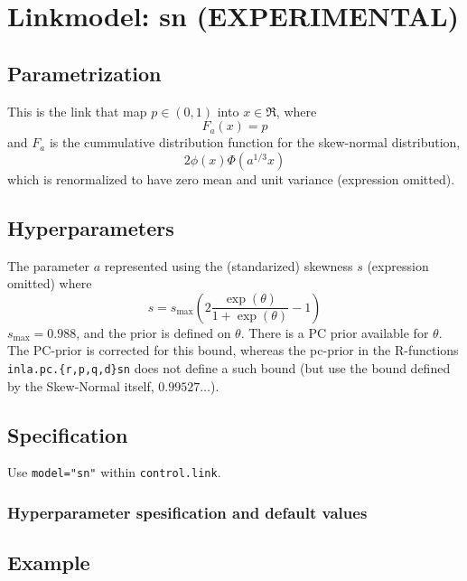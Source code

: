 \documentclass[a4paper,11pt]{article}
\begin{document}
\section*{Linkmodel: sn (EXPERIMENTAL)}

\subsection*{Parametrization}

This is the link that map $p\in (0,1)$ into $x\in\Re$, where
\begin{displaymath}
    F_{a}(x) = p
\end{displaymath}
and $F_{a}$ is the cummulative distribution function for the
skew-normal distribution,
\begin{displaymath}
    2\phi(x)\Phi(a^{1/3}x)
\end{displaymath}
which is renormalized to have zero mean and unit variance (expression
omitted).

\subsection*{Hyperparameters}

The parameter $a$ represented using the (standarized) skewness $s$
(expression omitted) where
\begin{displaymath}
    s = s_{\text{max}} \left(2\frac{\exp(\theta)}{1+ \exp(\theta)} -1\right)
\end{displaymath}
$s_{\text{max}} = 0.988$, and the prior is defined on $\theta$. There
is a PC prior available for $\theta$.
The PC-prior is corrected for
this bound, whereas the pc-prior in the R-functions
\texttt{inla.pc.\{r,p,q,d\}sn} does not define a such bound (but use
the bound defined by the Skew-Normal itself, $0.99527\ldots$).

\subsection*{Specification}

Use \texttt{model="sn"} within \texttt{control.link}.  

\subsubsection*{Hyperparameter spesification and default values}


\subsection*{Example}
\end{document}
